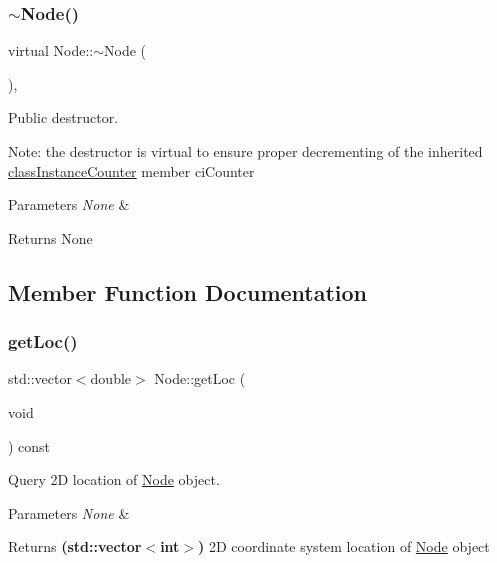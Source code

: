 \subsubsection{\texorpdfstring{$\sim$\+Node()}{~Node()}}
{\footnotesize\ttfamily virtual Node\+::$\sim$\+Node (\begin{DoxyParamCaption}{ }\end{DoxyParamCaption})\hspace{0.3cm}{\ttfamily [inline]}, {\ttfamily [virtual]}}



Public destructor. 

Note\+: the destructor is virtual to ensure proper decrementing of the inherited \mbox{\hyperlink{classclass_instance_counter}{class\+Instance\+Counter}} member ci\+Counter 
\begin{DoxyParams}{Parameters}
{\em None} & \\
\hline
\end{DoxyParams}
\begin{DoxyReturn}{Returns}
None 
\end{DoxyReturn}


\subsection{Member Function Documentation}
\mbox{\label{class_node_ae59cc8d62b6cfa623252b98341c3084c}} 
\subsubsection{\texorpdfstring{get\+Loc()}{getLoc()}}
{\footnotesize\ttfamily std\+::vector$<$double$>$ Node\+::get\+Loc (\begin{DoxyParamCaption}\item[{void}]{ }\end{DoxyParamCaption}) const\hspace{0.3cm}{\ttfamily [inline]}}



Query 2D location of \mbox{\hyperlink{class_node}{Node}} object. 


\begin{DoxyParams}{Parameters}
{\em None} & \\
\hline
\end{DoxyParams}
\begin{DoxyReturn}{Returns}
{\bfseries (std\+::vector$<$int$>$)} 2D coordinate system location of \mbox{\hyperlink{class_node}{Node}} object 
\end{DoxyReturn}
\mbox{\label{class_node_aeda47a1decedb8fc3835579d75b7d65f}} 
